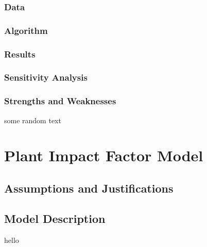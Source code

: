 \documentclass[12pt]{article}
\begin{document}
		\subsubsection{Data}
		
		\subsubsection{Algorithm}
		
		\subsubsection{Results}
		
		\subsubsection{Sensitivity Analysis}
		
		\subsubsection{Strengths and Weaknesses}
	
			some random text
		
\section{Plant Impact Factor Model}

	\subsection{Assumptions and Justifications}
	
	\subsection{Model Description}

		hello
		
\end{document}
